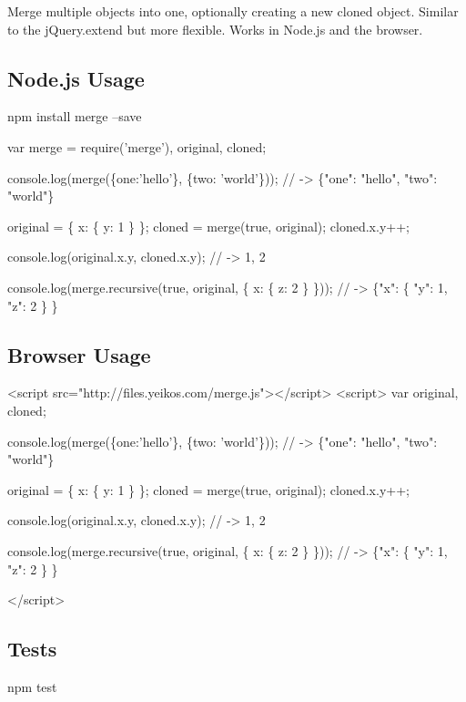 Merge multiple objects into one, optionally creating a new cloned object. Similar to the j\+Query.\+extend but more flexible. Works in Node.\+js and the browser.

\subsection*{Node.\+js Usage}


\begin{DoxyCode}
npm install merge --save
\end{DoxyCode}



\begin{DoxyCode}
var merge = require('merge'), original, cloned;

console.log(merge(\{one:'hello'\}, \{two: 'world'\}));
// -> \{"one": "hello", "two": "world"\}

original = \{ x: \{ y: 1 \} \};
cloned = merge(true, original);
cloned.x.y++;

console.log(original.x.y, cloned.x.y);
// -> 1, 2

console.log(merge.recursive(true, original, \{ x: \{ z: 2 \} \}));
// -> \{"x": \{ "y": 1, "z": 2 \} \}
\end{DoxyCode}


\subsection*{Browser Usage}


\begin{DoxyCode}
<script src="http://files.yeikos.com/merge.js"></script>
<script>
    var original, cloned;

    console.log(merge(\{one:'hello'\}, \{two: 'world'\}));
    // -> \{"one": "hello", "two": "world"\}

    original = \{ x: \{ y: 1 \} \};
    cloned = merge(true, original);
    cloned.x.y++;

    console.log(original.x.y, cloned.x.y);
    // -> 1, 2

    console.log(merge.recursive(true, original, \{ x: \{ z: 2 \} \}));
    // -> \{"x": \{ "y": 1, "z": 2 \} \}

</script>
\end{DoxyCode}


\subsection*{Tests}


\begin{DoxyCode}
npm test
\end{DoxyCode}
 